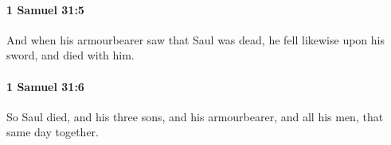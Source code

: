 		\paragraph{1 Samuel 31:5} %
			\label{1SAMUEL-31-5}

			And when his armourbearer saw that Saul was dead, he fell likewise upon his sword, and died with him.


		\paragraph{1 Samuel 31:6} %
			\label{1SAMUEL-31-6}

			So Saul died, and his three sons, and his armourbearer, and all his men, that same day together.


